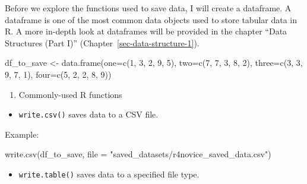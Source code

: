 \documentclass[
  letterpaper,
  DIV=11,
  numbers=noendperiod]{scrreprt}
\newenvironment{Shaded}{}{}
\newcommand{\AttributeTok}[1]{\textcolor[rgb]{0.84,0.23,0.29}{#1}}
\newcommand{\DecValTok}[1]{\textcolor[rgb]{0.00,0.36,0.77}{#1}}
\newcommand{\FunctionTok}[1]{\textcolor[rgb]{0.44,0.26,0.76}{#1}}
\newcommand{\NormalTok}[1]{\textcolor[rgb]{0.14,0.16,0.18}{#1}}
\newcommand{\OtherTok}[1]{\textcolor[rgb]{0.44,0.26,0.76}{#1}}
\newcommand{\StringTok}[1]{\textcolor[rgb]{0.01,0.18,0.38}{#1}}
\providecommand{\tightlist}{%
  \setlength{\itemsep}{0pt}\setlength{\parskip}{0pt}}\usepackage{longtable,booktabs,array}
\begin{document}
Before we explore the functions used to save data, I will create a
dataframe. A dataframe is one of the most common data objects used to
store tabular data in R. A more in-depth look at dataframes will be
provided in the chapter ``Data Structures (Part I)''
(Chapter~\ref{sec-data-structure-1}).

\begin{Shaded}
\begin{Highlighting}[]
\NormalTok{df\_to\_save }\OtherTok{\textless{}{-}} \FunctionTok{data.frame}\NormalTok{(}\AttributeTok{one=}\FunctionTok{c}\NormalTok{(}\DecValTok{1}\NormalTok{, }\DecValTok{3}\NormalTok{, }\DecValTok{2}\NormalTok{, }\DecValTok{9}\NormalTok{, }\DecValTok{5}\NormalTok{),}
                         \AttributeTok{two=}\FunctionTok{c}\NormalTok{(}\DecValTok{7}\NormalTok{, }\DecValTok{7}\NormalTok{, }\DecValTok{3}\NormalTok{, }\DecValTok{8}\NormalTok{, }\DecValTok{2}\NormalTok{),}
                         \AttributeTok{three=}\FunctionTok{c}\NormalTok{(}\DecValTok{3}\NormalTok{, }\DecValTok{3}\NormalTok{, }\DecValTok{9}\NormalTok{, }\DecValTok{7}\NormalTok{, }\DecValTok{1}\NormalTok{),}
                         \AttributeTok{four=}\FunctionTok{c}\NormalTok{(}\DecValTok{5}\NormalTok{, }\DecValTok{2}\NormalTok{, }\DecValTok{2}\NormalTok{, }\DecValTok{8}\NormalTok{, }\DecValTok{9}\NormalTok{))}
\end{Highlighting}
\end{Shaded}

\begin{enumerate}
\def\labelenumi{\arabic{enumi}.}
\tightlist
\item
  Commonly-used R functions
\end{enumerate}

\begin{itemize}
\tightlist
\item
  \texttt{write.csv()} saves data to a CSV file.
\end{itemize}

Example:

\begin{Shaded}
\begin{Highlighting}[]
\FunctionTok{write.csv}\NormalTok{(df\_to\_save, }\AttributeTok{file =} \StringTok{"saved\_datasets/r4novice\_saved\_data.csv"}\NormalTok{)}
\end{Highlighting}
\end{Shaded}

\begin{itemize}
\tightlist
\item
  \texttt{write.table()} saves data to a specified file type.
\end{itemize}
\end{document}
